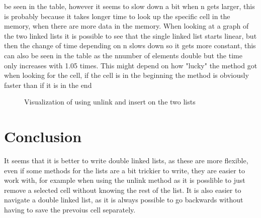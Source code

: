 \documentclass[a4paper,11pt]{article}
\begin{document}
be seen in the table, however it seems to slow down a bit when n gets larger, this is probably because it takes longer time to look up the specific cell in the memory, when there are more data in the memory.
\newline
\newline
When looking at a graph of the two linked lists it is possible to see that the single linked list starts linear, but then the change of time depending on n slows down
so it gets more constant, this can also be seen in the table as the nnumber of elements double but the time only increases with 1.05 times. This might depend on how "lucky" the method got when looking for the cell, if the cell is in the beginning
the method is obviously faster than if it is in the end
\begin{figure}[h]
    \centering    
    
    \scalebox{0.8}{}
    \caption{Visualization of using unlink and insert on the two lists}   
    \label{tab:figure1} 
    
    \end{figure}



\section*{Conclusion}
It seems that it is better to write double linked lists, as these are more flexible, even if some methods for the lists are a bit trickier to write, they are easier to work with, for example when using 
the unlink method as it is posslible to just remove a selected cell without knowing the rest of the list. It is also easier to navigate a double linked list, as it is always possible to go backwards without having
to save the prevoius cell separately.
\end{document}
